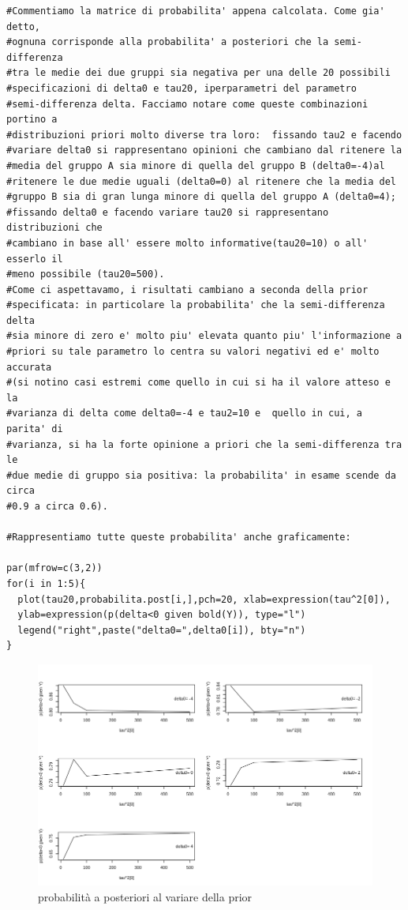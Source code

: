 \begin{itemize}
\begin{lstlisting}[style=R]
#Commentiamo la matrice di probabilita' appena calcolata. Come gia' detto,
#ognuna corrisponde alla probabilita' a posteriori che la semi-differenza
#tra le medie dei due gruppi sia negativa per una delle 20 possibili
#specificazioni di delta0 e tau20, iperparametri del parametro
#semi-differenza delta. Facciamo notare come queste combinazioni portino a
#distribuzioni priori molto diverse tra loro:  fissando tau2 e facendo
#variare delta0 si rappresentano opinioni che cambiano dal ritenere la
#media del gruppo A sia minore di quella del gruppo B (delta0=-4)al
#ritenere le due medie uguali (delta0=0) al ritenere che la media del
#gruppo B sia di gran lunga minore di quella del gruppo A (delta0=4);
#fissando delta0 e facendo variare tau20 si rappresentano distribuzioni che
#cambiano in base all' essere molto informative(tau20=10) o all' esserlo il
#meno possibile (tau20=500).
#Come ci aspettavamo, i risultati cambiano a seconda della prior
#specificata: in particolare la probabilita' che la semi-differenza delta
#sia minore di zero e' molto piu' elevata quanto piu' l'informazione a
#priori su tale parametro lo centra su valori negativi ed e' molto accurata
#(si notino casi estremi come quello in cui si ha il valore atteso e la
#varianza di delta come delta0=-4 e tau2=10 e  quello in cui, a parita' di
#varianza, si ha la forte opinione a priori che la semi-differenza tra le
#due medie di gruppo sia positiva: la probabilita' in esame scende da circa
#0.9 a circa 0.6).

#Rappresentiamo tutte queste probabilita' anche graficamente:

par(mfrow=c(3,2))
for(i in 1:5){
  plot(tau20,probabilita.post[i,],pch=20, xlab=expression(tau^2[0]),
  ylab=expression(p(delta<0 given bold(Y)), type="l")
  legend("right",paste("delta0=",delta0[i]), bty="n")
}

\end{lstlisting}

\begin{figure}[!ht]
 \centering
 \includegraphics[scale = 0.7]{img/esercizio8-2-1}
 \caption{probabilità a posteriori al variare della prior}
 \label{figure:figura12}
\end{figure}


\end{itemize}
